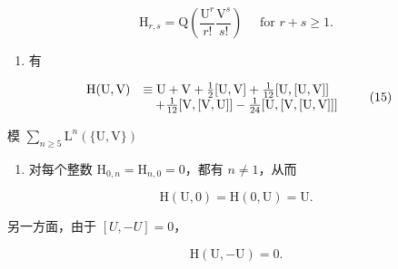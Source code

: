 \[
\mathrm{H} _ {r, s} = \mathrm{Q} \left(\frac {\mathrm{U} ^ {r}}{r !} \frac {\mathrm{V} ^ {s}}{s !}\right) \quad \text { for } r + s \geqslant 1.\tag{14}
\]

\begin{enumerate}
\def\labelenumi{(\arabic{enumi})}
\setcounter{enumi}{1}
\tightlist
\item
  有
\end{enumerate}

\[
\begin{array}{r l} \mathrm{H(U,V)} & \equiv \mathrm{U+V} + \frac {1}{2} [ \mathrm{U,V} ] + \frac {1}{12} [ \mathrm{U,[U,V]} ] \\ & \quad + \frac {1}{12} [ \mathrm{V,[V,U]} ] - \frac {1}{24} [ \mathrm{U,[V,[U,V]} ] ] \end{array} \tag {15}
\]

模 \(\sum_{n\geqslant 5}\mathrm{L}^n (\{\mathrm{U},\mathrm{V}\})\)

\begin{enumerate}
\def\labelenumi{(\arabic{enumi})}
\setcounter{enumi}{2}
\tightlist
\item
  对每个整数 \(\mathrm{H}_{0,n} = \mathrm{H}_{n,0} = 0\)，都有 \(n\neq 1\)，从而
\end{enumerate}

\[
\mathrm{H} (\mathrm{U}, 0) = \mathrm{H} (0, \mathrm{U}) = \mathrm{U}.\tag{16}
\]

另一方面，由于 \([U, -U] = 0\)，

\[
\mathrm{H} (\mathrm{U}, - \mathrm{U}) = 0.\tag{17}
\]

